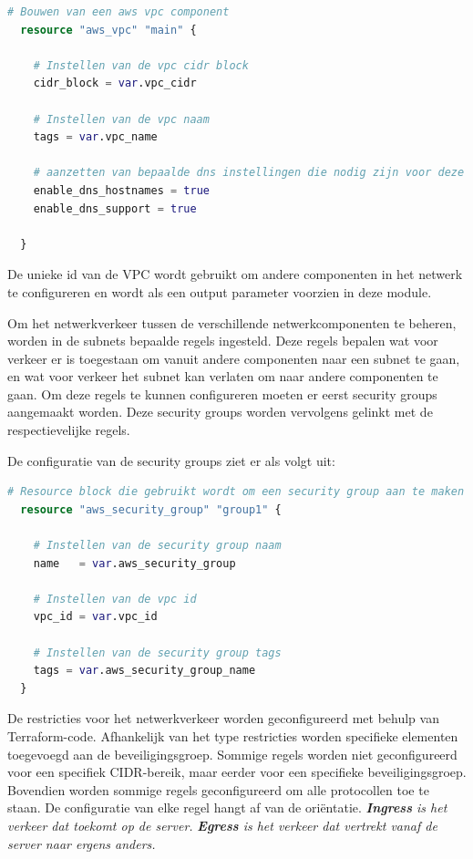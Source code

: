 \begin{lstlisting}[language=terraform]
  # Bouwen van een aws vpc component
  resource "aws_vpc" "main" {
  
    # Instellen van de vpc cidr block
    cidr_block = var.vpc_cidr
  
    # Instellen van de vpc naam
    tags = var.vpc_name
  
    # aanzetten van bepaalde dns instellingen die nodig zijn voor deze vpc
    enable_dns_hostnames = true
    enable_dns_support = true
  
  }
\end{lstlisting}

\vspace{0.5cm}
De unieke id van de VPC wordt gebruikt om andere componenten in het netwerk te configureren en wordt als een output parameter voorzien in deze module.
\newline

Om het netwerkverkeer tussen de verschillende netwerkcomponenten te beheren, worden in de subnets bepaalde regels ingesteld. Deze regels bepalen wat voor verkeer er is toegestaan om vanuit andere componenten naar een subnet te gaan, en wat voor verkeer het subnet kan verlaten om naar andere componenten te gaan. Om deze regels te kunnen configureren moeten er eerst security groups aangemaakt worden. Deze security groups worden vervolgens gelinkt met de respectievelijke regels.
\clearpage

De configuratie van de security groups ziet er als volgt uit:
\newline

\begin{lstlisting}[language=terraform]
  # Resource block die gebruikt wordt om een security group aan te maken
  resource "aws_security_group" "group1" { 
  
    # Instellen van de security group naam
    name   = var.aws_security_group
  
    # Instellen van de vpc id
    vpc_id = var.vpc_id 
  
    # Instellen van de security group tags
    tags = var.aws_security_group_name
  }
\end{lstlisting}

\vspace{0.5cm}
De restricties voor het netwerkverkeer worden geconfigureerd met behulp van Terraform-code. Afhankelijk van het type restricties worden specifieke elementen toegevoegd aan de beveiligingsgroep. Sommige regels worden niet geconfigureerd voor een specifiek CIDR-bereik, maar eerder voor een specifieke beveiligingsgroep. Bovendien worden sommige regels geconfigureerd om alle protocollen toe te staan. De configuratie van elke regel hangt af van de oriëntatie. \textit{\textbf{Ingress} is het verkeer dat toekomt op de server.} \textit{\textbf{Egress} is het verkeer dat vertrekt vanaf de server naar ergens anders.} \autocite{Zadeh2022}
\newline

